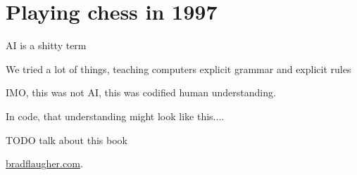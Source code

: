 \setchapterpreamble[u]{\margintoc}
\chapter{Playing chess in 1997}

AI is a shitty term

We tried a lot of things, teaching computers explicit grammar and explicit rules

IMO, this was not AI, this was codified human understanding.

In code, that understanding might look like this.... %

TODO talk about this book 

\href{https://bradflaugher.com}{bradflaugher.com}.  


